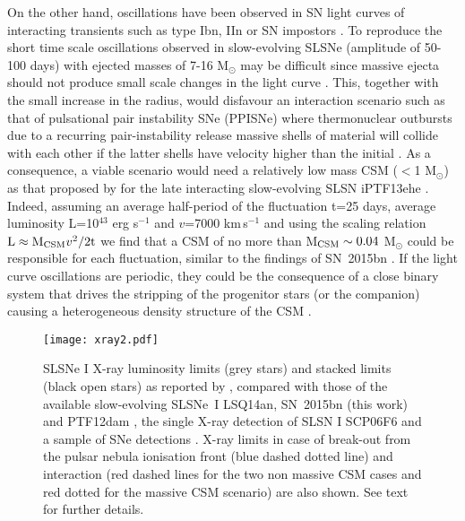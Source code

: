\documentclass[useAMS,usenatbib]{mn2e}
\def\kms{km\,s$^{-1}$}
\def\M{M$_{\odot}$}
\def\an{LSQ14an}
\begin{document}
On the other hand, oscillations have been observed in SN light curves of  interacting transients such as
type Ibn, IIn or SN impostors \citep[e.g. SNe 1998S, 2005ip, 2005la, 2009ip, 2011hw; SNhunt248][]{fa00,sm09,fox09,st12,pa08,fr13,mar14,ma15,sm12,pa15,erkki15}. To reproduce the short time scale oscillations observed in slow-evolving SLSNe (amplitude of 50-100 days) with ejected masses of 7-16 \M\/ \citep{ch15,ni16a,in16c} may be difficult since massive ejecta should not produce small scale changes in the light curve \citep[e.g.][]{gaw10,fr13}. This, together with the small increase in the radius, would disfavour an interaction scenario such as that of pulsational pair instability SNe (PPISNe) where thermonuclear outbursts due to a recurring pair-instability release massive shells of material will collide with each other if the latter shells have velocity higher than the initial \citep{woo07}. As a consequence, a viable scenario would need a relatively low mass CSM ($<$1 \M) as that proposed  by \citet{mo15} for the late interacting slow-evolving SLSN iPTF13ehe \citep{yan15}. Indeed, assuming an average half-period of the fluctuation t=25 days, average luminosity L=10$^{43}$ erg s$^{-1}$ and $v$=7000 \kms\/ \citep[this work,][]{gy09,yo10,ni13,ni16a} and using the scaling relation ${\rm L} \approx {\rm M_{CSM}}v^2 / 2{\rm t}$ \citep{qu07,smc07} we find that a CSM of no more than M$_{\rm CSM}\sim0.04$ \M\/ could be responsible for each fluctuation, similar to the findings of SN~2015bn \citep{ni16a}. If the light curve oscillations are periodic, they could be the consequence of a close binary system that drives the stripping of the progenitor stars (or the companion) causing a heterogeneous density structure of the CSM \citep[e.g.][]{we92,mo15}.

\begin{figure*} 
\texttt{[image: xray2.pdf]}
\caption{SLSNe I X-ray luminosity limits (grey stars) and stacked limits (black open stars) as reported by \citet[][but evaluated using the cosmology adopted here]{lev13}, compared with those of the available slow-evolving SLSNe~I \an\/, SN~2015bn (this work) and PTF12dam \citep[][]{lev13}, the single X-ray detection of SLSN I SCP06F6 and a sample of SNe detections \citep{of13}. X-ray limits in case of break-out from the pulsar nebula ionisation front (blue dashed dotted line) and interaction (red dashed lines for the two non massive CSM cases and red dotted for the massive CSM scenario) are also shown. See text for further details.}
\label{fig:x}
\end{figure*}
\end{document}
